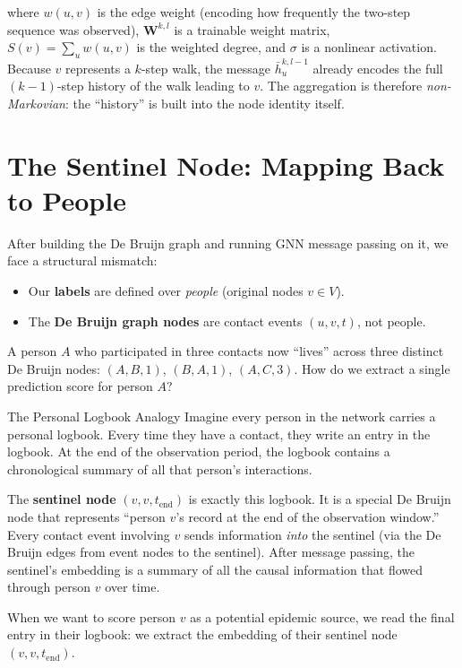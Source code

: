 where $w(u,v)$ is the edge weight (encoding how frequently the two-step sequence was observed),
$\mathbf{W}^{k,l}$ is a trainable weight matrix, $S(v) = \sum_{u} w(u,v)$ is the weighted
degree, and $\sigma$ is a nonlinear activation. Because $v$ represents a $k$-step walk, the
message $\bar{h}_u^{k,l-1}$ already encodes the full $(k-1)$-step history of the walk leading
to $v$. The aggregation is therefore \emph{non-Markovian}: the ``history'' is built into the
node identity itself.

\section{The Sentinel Node: Mapping Back to People}
\label{sec:sentinels}

After building the De Bruijn graph and running GNN message passing on it, we face a structural
mismatch:

\begin{itemize}
    \item Our \textbf{labels} are defined over \emph{people} (original nodes $v \in V$).
    \item The \textbf{De Bruijn graph nodes} are contact events $(u, v, t)$, not people.
\end{itemize}

A person $A$ who participated in three contacts now ``lives'' across three distinct De Bruijn
nodes: $(A, B, 1)$, $(B, A, 1)$, $(A, C, 3)$. How do we extract a single
prediction score for person $A$?

\begin{analogybox}{The Personal Logbook Analogy}
Imagine every person in the network carries a personal logbook. Every time they have a contact,
they write an entry in the logbook. At the end of the observation period, the logbook contains a
chronological summary of all that person's interactions.

The \textbf{sentinel node} $(v, v, t_{\text{end}})$ is exactly this logbook. It is a special
De Bruijn node that represents ``person $v$'s record at the end of the observation window.''
Every contact event involving $v$ sends information \emph{into} the sentinel (via the De Bruijn
edges from event nodes to the sentinel). After message passing, the sentinel's embedding is a
summary of all the causal information that flowed through person $v$ over time.

When we want to score person $v$ as a potential epidemic source, we read the final entry in
their logbook: we extract the embedding of their sentinel node $(v, v, t_{\text{end}})$.
\end{analogybox}

